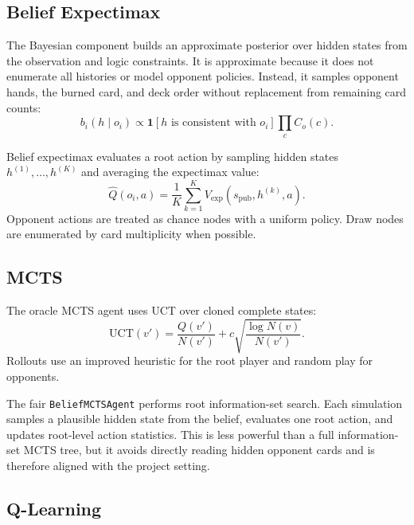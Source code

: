 \documentclass[10pt,twocolumn]{article}
\begin{document}
\subsection{Belief Expectimax}

The Bayesian component builds an approximate posterior over hidden states from
the observation and logic constraints. It is approximate because it does not
enumerate all histories or model opponent policies. Instead, it samples
opponent hands, the burned card, and deck order without replacement from
remaining card counts:
\begin{equation}
b_i(h \mid o_i) \propto
\mathbf{1}[h \text{ is consistent with } o_i]\prod_{c} C_o(c).
\end{equation}

Belief expectimax evaluates a root action by sampling hidden states
$h^{(1)},\ldots,h^{(K)}$ and averaging the expectimax value:
\begin{equation}
\hat{Q}(o_i,a) = \frac{1}{K}\sum_{k=1}^{K}
V_{\mathrm{exp}}(s_{\mathrm{pub}}, h^{(k)}, a).
\end{equation}
Opponent actions are treated as chance nodes with a uniform policy. Draw nodes
are enumerated by card multiplicity when possible.

\subsection{MCTS}

The oracle MCTS agent uses UCT over cloned complete states:
\begin{equation}
\mathrm{UCT}(v') =
\frac{Q(v')}{N(v')} +
c\sqrt{\frac{\log N(v)}{N(v')}}.
\end{equation}
Rollouts use an improved heuristic for the root player and random play for
opponents.

The fair \texttt{BeliefMCTSAgent} performs root information-set search. Each
simulation samples a plausible hidden state from the belief, evaluates one
root action, and updates root-level action statistics. This is less powerful
than a full information-set MCTS tree, but it avoids directly reading hidden
opponent cards and is therefore aligned with the project setting.

\subsection{Q-Learning}
\end{document}
